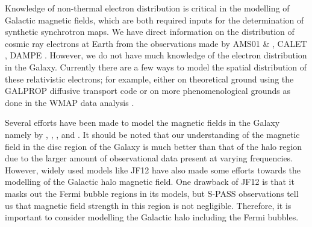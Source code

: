 \documentclass[usenatbib]{mnras}
\newcommand{\Arjen}[1]{{\color{brown}#1}}
\newcommand{\Vasu}[1]{{\color{purple}#1}}
\begin{document}
Knowledge of non-thermal electron distribution is critical in the modelling of Galactic magnetic fields, which are both required inputs for the determination of synthetic synchrotron maps.
We have direct information on the distribution of cosmic ray electrons at Earth from the observations made by AMS01 \cite{AMS_2002} \& \cite{AMS_2014}, CALET \cite{Calet_2017}, DAMPE \cite{Dampe_2017}. However, we do not have much knowledge of the electron distribution in the Galaxy.
Currently there are a few ways to model the spatial distribution of these relativistic electrons; for example, either on theoretical ground using the GALPROP diffusive transport code \cite{Hammurabi} \cite{Orlando_2011} or on more phenomenological grounds as done in the WMAP data analysis \cite{WMAP_Page}.


Several efforts have  been made to model the magnetic fields in the Galaxy namely by \cite{Jaffe_2010}, \cite{Jaffe_2011}, \cite{Sun_2008}, and \cite{JF12}. It should be noted that our understanding of the magnetic field in the disc region of the Galaxy is much better than that of the halo region due to the larger amount of observational data present at varying frequencies. However, widely used models like JF12 \cite{JF12} have also made some efforts towards the modelling of the Galactic halo magnetic field. One drawback of JF12 \cite{JF12} is that it masks out the Fermi bubble regions in its models, but S-PASS \cite{Carretti_2013} observations tell us that magnetic field strength in this region is not negligible. Therefore, it is important to consider modelling the Galactic halo including the Fermi bubbles.

\end{document}
